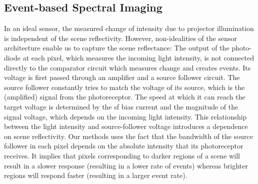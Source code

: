 \subsection{Event-based Spectral Imaging}
\label{sec:emi}
In an ideal sensor, the measured change of intensity due to projector illumination is independent of the scene reflectivity.
However, non-idealities of the sensor architecture enable us to capture the scene reflectance:
The output of the photo-diode at each pixel, which measures the incoming light intensity, is not connected directly to the comparator circuit which measures change and creates events.
Its voltage is first passed through an amplifier and a source follower circuit. 
The source follower constantly tries to match the voltage of its source, which is the (amplified) signal from the photoreceptor.
The speed at which it can reach the target voltage is determined by the sf bias current and the magnitude of the signal voltage, which depends on the incoming light intensity.
This relationship between the light intensity and source-follower voltage introduces a dependence on scene reflectivity.
Our methods uses the fact that the bandwidth of the source follower in each pixel depends on the absolute intensity that its photoreceptor receives.
It implies that pixels corresponding to darker regions of a scene will result in a slower response (resulting in a lower rate of events) whereas brighter regions will respond faster (resulting in a larger event rate).



